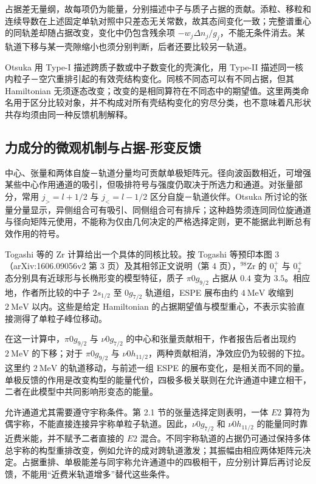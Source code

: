 占据差无量纲，故每项仍为能量，分别描述中子与质子占据的贡献。添粒、移粒和连续导数在上述固定单轨对照中只差态无关常数，故其态间变化一致；完整谱重心的同轨差却随占据改变，变化中仍包含残余项 $-w_j\Delta n_j/g_j$，不能无条件消去。某轨道下移与某一壳隙缩小也须分别判断，后者还要比较另一轨道。

Otsuka 用 Type-I 描述跨质子数或中子数变化的壳演化，用 Type-II 描述同一核内粒子－空穴重排引起的有效壳结构变化。同核不同态可以有不同占据，但其 Hamiltonian 无须逐态改变；改变的是相同算符在不同态中的期望值。这里两类命名用于区分比较对象，并不构成对所有壳结构变化的穷尽分类，也不意味着凡形状共存均须由同一种反馈机制解释。\cite{doctoral-r1-g28-otsuka-2023-type-ii-shell-evolution}



\subsection{力成分的微观机制与占据-形变反馈}\label{sec:2-2-3}


中心、张量和两体自旋－轨道分量均可贡献单极矩阵元。径向波函数相近，可增强某些中心作用通道的吸引，但吸排符号与强度仍取决于所选力和通道。对张量部分，常用 $j_>=l+1/2$ 与 $j_<=l-1/2$ 区分自旋－轨道伙伴。Otsuka 所讨论的张量分量显示，异侧组合可有吸引、同侧组合可有排斥；这种趋势须连同同位旋通道与径向矩阵元使用，不能称为仅由几何决定的严格选择定则，更不能据此判断总有效作用的符号。\cite{doctoral-r1-g28-otsuka-2023-type-ii-shell-evolution}

Togashi 等的 Zr 计算给出一个具体的同核比较。按 Togashi 等预印本图 3（arXiv:\allowbreak{}1606.\allowbreak{}09056v2 第 3 页）及其相邻正文说明（第 4 页），$^{98}\mathrm{Zr}$ 的 $0_1^+$ 与 $0_2^+$ 态分别具有近球形与长椭形变的模型特征，质子 $\pi0g_{9/2}$ 占据从 $0.4$ 变为 $3.5$。相应地，作者所比较的中子 $2s_{1/2}$ 至 $0g_{7/2}$ 轨道组，ESPE 展布由约 $4\ \mathrm{MeV}$ 收缩到 $2\ \mathrm{MeV}$ 以内。这些是给定 Hamil\-to\-nian 的占据期望值与模型重心，不表示实验直接测得了单粒子峰位移动。\cite{doctoral-r1-g28-togashi-2016-zr-mcsm-qpt}

在这一计算中，$\pi0g_{9/2}$ 与 $\nu0g_{7/2}$ 的中心和张量贡献相干，作者报告后者出现约 $2\ \mathrm{MeV}$ 的下移；对于 $\pi0g_{9/2}$ 与 $\nu0h_{11/2}$，两种贡献相消，净效应仍为较弱的下拉。这里约 $2\ \mathrm{MeV}$ 的轨道移动，与前述一组 ESPE 的展布变化，是相关而不同的量。单极反馈的作用是改变构型的能量代价，四极多极关联则在允许通道中建立相干，二者在此模型中共同影响形变态的能量。

允许通道尤其需要遵守宇称条件。第 2.1 节的张量选择定则表明，一体 $E2$ 算符为偶宇称，不能直接连接异宇称单粒子轨道。因此，$\nu0g_{7/2}$ 和 $\nu0h_{11/2}$ 的能量同时靠近费米能，并不赋予二者直接的 $E2$ 混合。不同宇称轨道的占据仍可通过保持多体总宇称的构型重排改变，例如允许的成对跨轨道激发；其振幅由相应两体矩阵元决定。占据重排、单极能差与同宇称允许通道中的四极相干，应分别计算后再讨论反馈，不能用“近费米轨道增多”替代这些条件。




